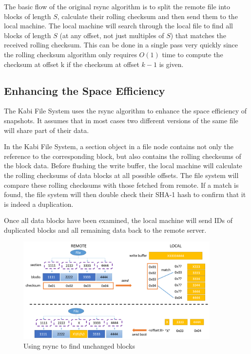     The basic flow of the original rsync algorithm is to split the remote file into blocks of length $S$, calculate their rolling checksum and then send them to the local machine. The local machine will search through the local file to find all blocks of length $S$ (at any offset, not just multiples of $S$) that matches the received rolling checksum. This can be done in a single pass very quickly since the rolling checksum algorithm only requires $O(1)$ time to compute the checksum at offset k if the checksum at offset $k-1$ is given.

\subsection{Enhancing the Space Efficiency}

    The Kabi File System uses the rsync algorithm to enhance the space efficiency of snapshots. It assumes that in most cases two different versions of the same file will share part of their data.

    In the Kabi File System, a section object in a file node contains not only the reference to the corresponding block, but also contains the rolling checksums of the block data. Before flushing the write buffer, the local machine will calculate the rolling checksums of data blocks at all possible offsets. The file system will compare these rolling checksums with those fetched from remote. If a match is found, the file system will then double check their SHA-1 hash to confirm that it is indeed a duplication.
    
    Once all data blocks have been examined, the local machine will send IDs of duplicated blocks and all remaining data back to the remote server.


\begin{figure}[t]
\centering
\includegraphics[width=0.9\textwidth]{Chapter-4/figs/fig25.png}
\caption{Using rsync to find unchanged blocks}
\label{fig:rsync}
\end{figure}

